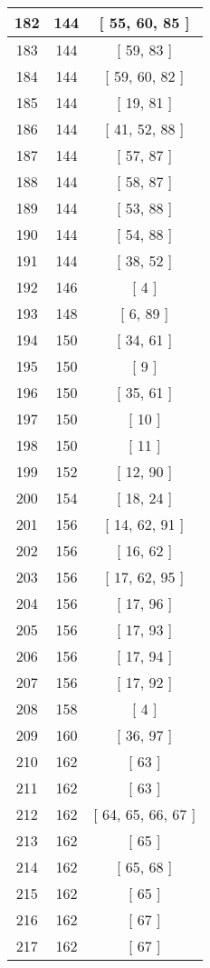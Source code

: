 \begin{center}
\begin{longtable}[H]{|| c c c ||}
\hline
182 & 144 & [ 55, 60, 85 ] \\ 
\hline
183 & 144 & [ 59, 83 ] \\ 
\hline
184 & 144 & [ 59, 60, 82 ] \\ 
\hline
185 & 144 & [ 19, 81 ] \\ 
\hline
186 & 144 & [ 41, 52, 88 ] \\ 
\hline
187 & 144 & [ 57, 87 ] \\ 
\hline
188 & 144 & [ 58, 87 ] \\ 
\hline
189 & 144 & [ 53, 88 ] \\ 
\hline
190 & 144 & [ 54, 88 ] \\ 
\hline
191 & 144 & [ 38, 52 ] \\ 
\hline
192 & 146 & [ 4 ] \\ 
\hline
193 & 148 & [ 6, 89 ] \\ 
\hline
194 & 150 & [ 34, 61 ] \\ 
\hline
195 & 150 & [ 9 ] \\ 
\hline
196 & 150 & [ 35, 61 ] \\ 
\hline
197 & 150 & [ 10 ] \\ 
\hline
198 & 150 & [ 11 ] \\ 
\hline
199 & 152 & [ 12, 90 ] \\ 
\hline
200 & 154 & [ 18, 24 ] \\ 
\hline
201 & 156 & [ 14, 62, 91 ] \\ 
\hline
202 & 156 & [ 16, 62 ] \\ 
\hline
203 & 156 & [ 17, 62, 95 ] \\ 
\hline
204 & 156 & [ 17, 96 ] \\ 
\hline
205 & 156 & [ 17, 93 ] \\ 
\hline
206 & 156 & [ 17, 94 ] \\ 
\hline
207 & 156 & [ 17, 92 ] \\ 
\hline
208 & 158 & [ 4 ] \\ 
\hline
209 & 160 & [ 36, 97 ] \\ 
\hline
210 & 162 & [ 63 ] \\ 
\hline
211 & 162 & [ 63 ] \\ 
\hline
212 & 162 & [ 64, 65, 66, 67 ] \\ 
\hline
213 & 162 & [ 65 ] \\ 
\hline
214 & 162 & [ 65, 68 ] \\ 
\hline
215 & 162 & [ 65 ] \\ 
\hline
216 & 162 & [ 67 ] \\ 
\hline
217 & 162 & [ 67 ] \\ 

\end{longtable}
\end{center}
